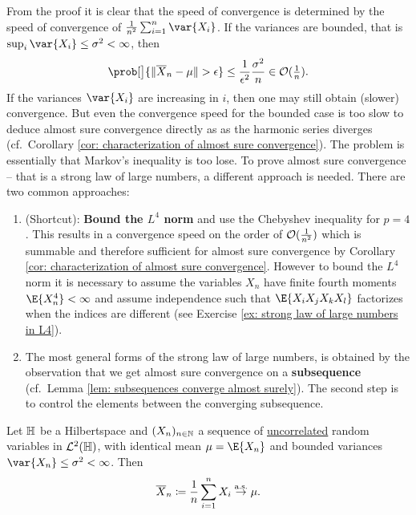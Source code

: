 From the proof it is clear that the speed of convergence is determined by the
speed of convergence of \(\frac1{n^2} \sum_{i=1}^n \var{X_i}\).
If the variances are bounded, that is
\(\sup_{i}\var{X_i} \le \sigma^2 < \infty\),
then
\begin{equation}
    \label{eq: rate of convergence for bounded variance}    
    \prob[\big]{\norm{\mean{X}_n - \mu} > \epsilon}
    \le \frac1{\epsilon^2}\frac{\sigma^2}{n} \in \bigO(\tfrac1n).
\end{equation}
If the variances \(\var{X_i}\) are increasing in \(i\), then one
may still obtain (slower) convergence. But even the convergence speed for the
bounded case is too slow to deduce almost sure convergence directly as 
as the harmonic series diverges (cf.\ Corollary \ref{cor: characterization of
almost sure convergence}). The problem is essentially that Markov's inequality
is too lose. To prove almost sure convergence -- that is a strong
law of large numbers, a different approach is needed. There are
two common approaches:
\begin{enumerate}
    \item (Shortcut): \textbf{Bound the \(L^4\) norm} and use the Chebyshev inequality
    for \(p=4\). This results in a convergence speed on the order of
    \(\mathcal{O}(\frac1{n^2})\) which is summable and therefore sufficient for almost
    sure convergence by Corollary \ref{cor: characterization of almost sure
    convergence}.  However to bound the \(L^4\) norm it is necessary to assume
    the variables \(X_n\) have finite fourth moments \(\E{X_n^4} < \infty\) and
    assume independence such that \(\E{X_i X_j X_k X_l}\) factorizes when the
    indices are different (see Exercise \ref{ex: strong law of large numbers in
    L4}).

    \item The most general forms of the strong law of large numbers, is
    obtained by the observation that we get almost sure convergence
    on a \textbf{subsequence} (cf.\ Lemma \ref{lem: subsequences converge almost
    surely}). The second step is to control the elements between the
    converging subsequence.
\end{enumerate}

\begin{mdframed}[innertopmargin=0pt]%
\begin{theorem}
    \label{thm: strong law of large numbers}
    Let \(\mathbb{H}\) be a Hilbertspace and \((X_n)_{n\in \mathbb{N}}\) a sequence
    of \underline{uncorrelated} random variables in \(\mathcal{L}^2(\mathbb{H})\), with identical mean
    \(\mu = \E{X_n}\) and bounded variances \(\var{X_n} \le \sigma^2 < \infty\).
    Then
    \[
        \overline{X}_n \coloneq \frac1n \sum_{i=1}^n X_i \overset{\operatorname{\text{a.s.}}}\to \mu.
    \]
\end{theorem}
\end{mdframed}

